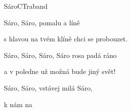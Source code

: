 \begin{song}{Sáro}{C}{Traband}
\begin{SBVerse}
\end{SBVerse}

\begin{SBChorus}

Sáro, Sáro, pomalu a líně 

s hlavou na tvém klíně chci se probouzet. 

Sáro, Sáro, Sáro, Sáro rosa padá ráno 

a v poledne už možná bude jiný svět!

\end{SBChorus}

\begin{SBVerse}

Sáro, Sáro, vstávej milá Sáro, 

 k nám  na 

\end{SBVerse}

\end{song}

\pagebreak